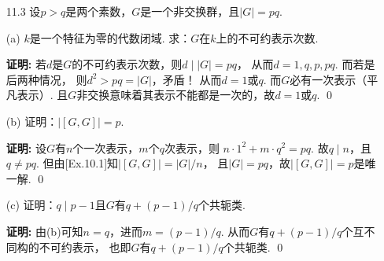 \begin{enumerate}
\begin{center}
    \begin{tabular}{|c|c|c|c|c|c|}
        $G$ & $e$ & $g$ & $C_{3}$ & $C_{4}$ & $C_{5}$ \\ 
        $1$ & $1$ & $1$ & $1$ & $1$ & $1$ \\ 
        $\chi_{1}$ & $1$ & $1$ & $-1$ & $-1$ & $1$ \\ 
        $\chi_{2}$ & $1$ & $1$ & $1$ & $-1$ & $-1$ \\ 
        $\chi_{3}$ & $1$ & $1$ & $-1$ & $1$ & $-1$ \\ 
        $\chi$ & $2$ & $-2$ & $0$ & $0$ & $0$
    \end{tabular}
    \end{center}
        且验证知这些特征确实互相正交，且自身作内积得$1$. 
        至此我们求得了$8$阶非Abel群的特征标表.
        由于求解没有用到$D_{4}$与$Q_{8}$的具体性质，故两者的特征标表都如上. \qed

        \begin{remark}
            这则例子说明两个不同构的群可能具有相同的特征标表.
        \end{remark}

        \item[11.3] 设$p > q$是两个素数，$G$是一个非交换群，且$|G|=pq$.
        \item[(a)] $k$是一个特征为零的代数闭域. 求：$G$在$k$上的不可约表示次数.
        \item[\textbf{证明:}]
            若$d$是$G$的不可约表示次数，则$d \mid |G| = pq$，
            从而$d = 1, q ,p, pq$. 而若是后两种情况，
            则$d^{2} > pq = |G|$，矛盾！
            从而$d = 1$或$q$.
            而$G$必有一次表示（平凡表示）.
            且$G$非交换意味着其表示不能都是一次的，故$d = 1$或$q$. \qed

        \item[(b)] 证明：$|[G,G]|=p$.
        \item[\textbf{证明:}]
            设$G$有$n$个一次表示，$m$个$q$次表示，则
            $n \cdot 1^{2} + m \cdot q^{2} = pq$.
            故$q \mid n$，且$q \neq pq$. 但由[Ex.10.1]知$|[G,G]| = |G|/n$，
            且$|G|=pq$，故$|[G,G]| = p$是唯一解. \qed

        \item[(c)] 证明：$q \mid p-1$且$G$有$q + (p-1)/q$个共轭类.
        \item[\textbf{证明:}]
            由(b)可知$n=q$，进而$m = (p-1)/q$. 
            从而$G$有$q + (p-1)/q$个互不同构的不可约表示，
            也即$G$有$q + (p-1)/q$个共轭类. \qed


\end{enumerate}
